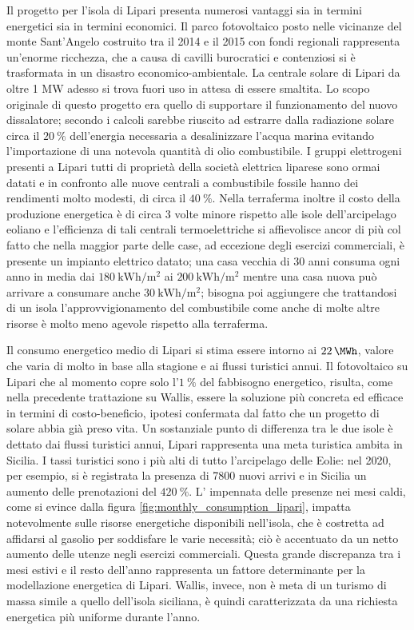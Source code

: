 \documentclass[fleqn,11pt]{SelfArx} %
\begin{document}
Il progetto per l'isola di Lipari presenta numerosi vantaggi sia in termini energetici sia in termini economici. Il parco fotovoltaico posto nelle vicinanze del monte Sant'Angelo costruito tra il 2014 e il 2015 con fondi regionali rappresenta un'enorme ricchezza, che a causa di cavilli burocratici e contenziosi si è trasformata in un disastro economico-ambientale. La centrale solare di Lipari da oltre 1 MW adesso si trova fuori uso in attesa di essere smaltita. Lo scopo originale di questo progetto era quello di supportare il funzionamento del nuovo dissalatore; secondo i calcoli sarebbe riuscito ad estrarre dalla radiazione solare circa il \(\SI{20}{\percent}\) dell'energia necessaria a desalinizzare l'acqua marina evitando l'importazione di una notevola quantità di olio combustibile. I gruppi elettrogeni presenti a Lipari tutti di proprietà della società elettrica liparese sono ormai datati e in confronto alle nuove centrali a combustibile fossile hanno dei rendimenti molto modesti, di circa il \(\SI{40}{\percent}\). Nella terraferma inoltre il costo della produzione energetica è di circa 3 volte minore rispetto alle isole dell'arcipelago eoliano e l'efficienza di tali centrali termoelettriche si affievolisce ancor di più col fatto che nella maggior parte delle case, ad eccezione degli esercizi commerciali, è presente un impianto elettrico datato; una casa vecchia  di 30 anni consuma ogni anno in media dai \(\SI{180}{\kWh\per\metre\squared}\) ai \(\SI{200}{\kWh\per\metre\squared}\) mentre una casa nuova può arrivare a consumare anche \(\SI{30}{\kWh\per\metre\squared}\); bisogna poi aggiungere che trattandosi di un isola l'approvvigionamento del combustibile come anche di molte altre risorse è molto meno agevole rispetto alla terraferma.

Il consumo energetico medio di Lipari si stima essere intorno ai \(\SI{22}{\MWh}\), valore che varia di molto in base alla stagione e ai flussi turistici annui.  
Il fotovoltaico su Lipari che al momento copre solo l'\(\SI{1}{\percent}\) del fabbisogno energetico, risulta, come nella precedente trattazione su Wallis, essere la soluzione più concreta ed efficace in termini di costo-beneficio, ipotesi confermata dal fatto che un progetto di solare abbia già preso vita. Un sostanziale punto di differenza tra le due isole è dettato dai flussi turistici annui, Lipari rappresenta una meta turistica ambita in Sicilia. I tassi turistici sono i più alti di tutto l'arcipelago delle Eolie: nel 2020, per esempio, si è registrata la presenza di 7800 nuovi arrivi e in Sicilia un aumento delle prenotazioni del \(\SI{420}{\percent}\). L' impennata delle presenze nei mesi caldi, come si evince dalla figura \ref{fig:monthly_consumption_lipari}, impatta notevolmente sulle risorse energetiche disponibili nell'isola, che è costretta ad affidarsi al gasolio per soddisfare le varie necessità; ciò è accentuato da un netto aumento delle utenze negli esercizi commerciali. Questa grande discrepanza tra i mesi estivi e il resto dell'anno rappresenta un fattore determinante per la modellazione energetica di Lipari. Wallis, invece, non è meta di un turismo di massa simile a quello dell'isola siciliana, è quindi caratterizzata da una richiesta energetica più uniforme durante l'anno.
\end{document}
